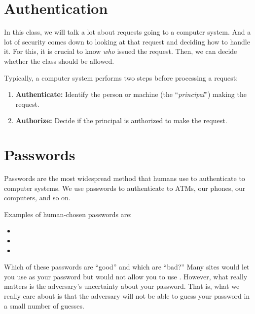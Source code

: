 \section{Authentication}
In this class, we will talk a lot about requests
going to a computer system.
And a lot of security comes down to looking at that request and deciding
how to handle it.
For this, it is crucial to know
\textit{who} issued the request. Then, we can
decide whether the class should be allowed.

Typically, a computer system performs two steps before processing
a request:
\begin{enumerate}
  \item \textbf{Authenticate:} Identify the person or machine (the ``\emph{principal}'') making the request.
  \item \textbf{Authorize:} Decide if the principal is authorized to make the request.
\end{enumerate}

\section{Passwords}
Passwords are the most widespread method 
that humans use to authenticate to computer systems.
We use passwords to authenticate to ATMs,
our phones, our computers, and so on.

Examples of human-chosen passwords are:
\begin{itemize}
	\item {}
	\item {}
	\item {}
\end{itemize}

Which of these passwords are ``good'' and which
are ``bad?''
Many sites would let you use
 as your password but would not allow
you to use .
However, what really matters is the adversary's
uncertainty about your password.
That is, what we really care about is that the adversary
will not be able to guess your password in
a small number of guesses.


